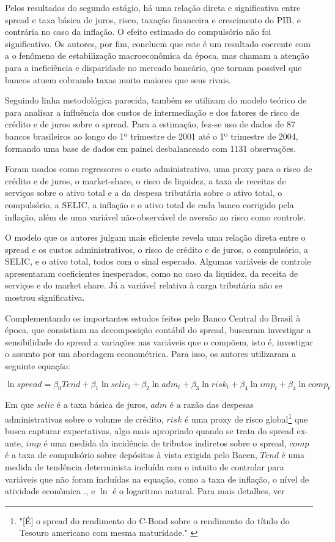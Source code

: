 \documentclass[a4paper,
               article,
               12pt,
               openany,
               oneside,
               english,
               brazil]{abntex2}
\numberwithin{equation}{section}
\begin{document}
    Pelos resultados do segundo estágio, há uma relação direta e significativa entre spread e taxa básica de juros, risco, taxação financeira e crescimento do PIB, e contrária no caso da inflação. O efeito estimado do compulsório não foi significativo. Os autores, por fim, concluem que este é um resultado coerente com a o fenômeno de estabilização macroeconômica da época, mas chamam a atenção para a ineficiência e disparidade no mercado bancário, que tornam possível que bancos atuem cobrando taxas muito maiores que seus rivais.

    Seguindo linha metodológica parecida, \textcite{bignotto06} também se utilizam do modelo teórico de \textcite{hoesaunders} para analisar a influência dos custos de intermediação e dos fatores de risco de crédito e de juros sobre o spread. Para a estimação, fez-se uso de dados de 87 bancos brasileiros ao longo do 1º trimestre de 2001 até o 1º trimestre de 2004, formando uma base de dados em painel desbalanceado com 1131 observações.
    
    Foram usados como regressores o custo administrativo, uma proxy para o risco de crédito e de juros, o market-share, o risco de liquidez, a taxa de receitas de serviços sobre o ativo total e a da despesa tributária sobre o ativo total, o compulsório, a SELIC, a inflação e o ativo total de cada banco corrigido pela inflação, além de uma variável não-observável de aversão ao risco como controle. 
    
    O modelo que os autores julgam mais eficiente revela uma relação direta entre o spread e os custos administrativos, o risco de crédito e de juros, o compulsório, a SELIC, e o ativo total, todos com o sinal esperado. Algumas variáveis de controle apresentaram coeficientes inesperados, como no caso da liquidez, da receita de serviços e do market share. Já a variável relativa à carga tributária não se mostrou significativa.

    Complementando os importantes estudos feitos pelo Banco Central do Brasil à época, que consistiam na decomposição contábil do spread, \textcite{nakane02} buscaram investigar a sensibilidade do spread a variações nas variáveis que o compõem, isto é, investigar o assunto por um abordagem econométrica. Para isso, os autores utilizaram a seguinte equação:

    $$\ln spread = \beta_0Tend + \beta_1\ln selic_t + \beta_2\ln adm_t + \beta_3\ln risk_t + \beta_4\ln imp_t + \beta_4\ln comp_t$$

    Em que $selic$ é a taxa básica de juros, $adm$ é a razão das despesas administrativas sobre o volume de crédito, $risk$ é uma proxy de risco global\footnote{"[É] o spread do rendimento do C-Bond sobre o rendimento do título do Tesouro americano com mesma maturidade." \cite[p.~10]{nakane02}} que busca capturar expectativas, algo mais apropriado quando se trata do spread ex-ante, $imp$ é uma medida da incidência de tributos indiretos sobre o spread, $comp$ é a taxa de compulsório sobre depósitos à vista exigida pelo Bacen,  $Tend$ é uma medida de tendência determinista incluída com o intuito de controlar para variáveis que não foram incluídas na equação, como a taxa de inflação, o nível de atividade econômica \etc., e $\ln$ é o logaritmo natural. Para mais detalhes, ver \textcite[p.~10]{nakane02}
\end{document}
